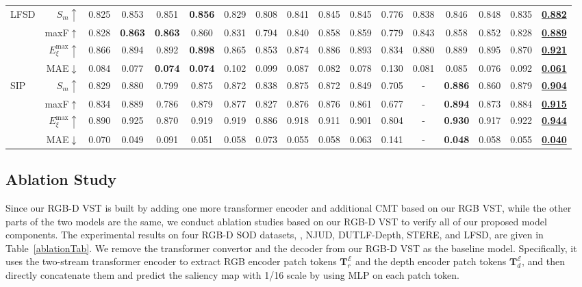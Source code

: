\documentclass[10pt,twocolumn,letterpaper]{article}
\def\blu#1{\textbf{\color{blue} #1}} \def\red#1{\textbf{\color{red}\underline{#1}}}
\begin{document}
\begin{table*}[t]
\begin{tabular}{lr|cccccccccccccc|c}
  \multirow{4}{*}{LFSD}
    & $S_m\uparrow$  &0.825 &0.853 &0.851 &\blu{0.856} &0.829 &0.808 &0.841 &0.845 &0.845 &0.776 &0.838 &0.846 &0.848 &0.835 &\red{0.882} \\
    & maxF$\uparrow$  &0.828 &\blu{0.863} &\blu{0.863} &0.860 &0.831 &0.794 &0.840 &0.858 &0.859 &0.779 &0.843 &0.858 &0.852 &0.828 &\red{0.889} \\
    & $E_{\xi}^{\text{max}}\uparrow$  &0.866 &0.894 &0.892 &\blu{0.898} &0.865 &0.853 &0.874 &0.886 &0.893 &0.834 &0.880 &0.889 &0.895 &0.870 &\red{0.921}\\
    \cite{li2014lfsd}& MAE$\downarrow$  &0.084 &0.077 &\blu{0.074} &\blu{0.074} &0.102 &0.099 &0.087 &0.082 &0.078 &0.130 &0.081 &0.085 &0.076 &0.092 &\red{0.061} \\
     \hline

  \multirow{4}{*}{SIP}
    & $S_m\uparrow$  &0.829 &0.880 &0.799 &0.875 &0.872 &0.838 &0.875 &0.872 &0.849 &0.705 &- &\blu{0.886} &0.860 &0.879 &\red{0.904}\\
    & maxF$\uparrow$  &0.834 &0.889 &0.786 &0.879 &0.877 &0.827 &0.876 &0.876 &0.861 &0.677 &- &\blu{0.894} &0.873 &0.884 &\red{0.915}\\
    & $E_{\xi}^{\text{max}}\uparrow$  &0.890 &0.925 &0.870 &0.919 &0.919 &0.886 &0.918 &0.911 &0.901 &0.804 &- &\blu{0.930} &0.917 &0.922 &\red{0.944}\\
    \cite{fan2020SIP} & MAE$\downarrow$ &0.070 &0.049 &0.091 &0.051 &0.058 &0.073 &0.055 &0.058 &0.063 &0.141 &- &\blu{0.048} &0.058 &0.055 &\red{0.040}\\
     \hline

  \end{tabular}
  \label{RGBD_SOTA}
   \vspace{-4mm}
\end{table*}

\subsection{Ablation Study}\label{sec:ablation}
Since our RGB-D VST is built by adding one more transformer encoder and additional CMT based on our RGB VST, while the other parts of the two models are the same, we conduct ablation studies based on our RGB-D VST to verify all of our proposed model components.
The experimental results on four RGB-D SOD datasets, \ie, NJUD, DUTLF-Depth, STERE, and LFSD, are given in Table~\ref{ablationTab}.
We remove the transformer convertor and the decoder from our RGB-D VST as the baseline model. 
Specifically, it uses the two-stream transformer encoder to extract RGB encoder patch tokens $\bm{T}_r^{\mathcal{E}}$ and the depth encoder patch tokens $\bm{T}_d^{\mathcal{E}}$, and then directly concatenate them and predict the saliency map with 1/16 scale by using MLP on each patch token.
\end{document}
